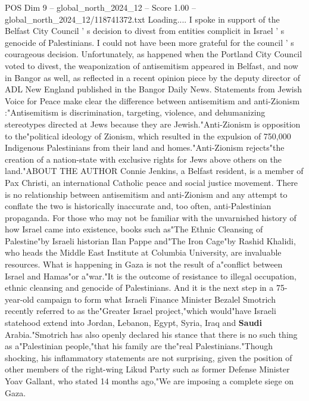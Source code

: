 \begin{textsample}{POS Dim 9 – global\_north\_2024\_12 – Score 1.00 – global\_north\_2024\_12/118741372.txt}  \label{ex:f9_pos_332}
Loading....
I spoke in support of the Belfast City Council ' s decision to divest from entities complicit in Israel ' s genocide of Palestinians.
I could not have been more grateful for the council ' s courageous decision.
Unfortunately, as happened when the Portland City Council voted to divest, the weaponization of antisemitism appeared in Belfast, and now in Bangor as well, as reflected in a recent opinion piece by the deputy director of ADL New England published in the Bangor Daily News.
Statements from Jewish Voice for Peace make clear the difference between antisemitism and anti-Zionism :"Antisemitism is discrimination, targeting, violence, and dehumanizing stereotypes directed at Jews because they are Jewish."Anti-Zionism is opposition to the"political ideology of Zionism, which resulted in the expulsion of 750,000 Indigenous Palestinians from their land and homes."Anti-Zionism rejects"the creation of a nation-state with exclusive rights for Jews above others on the land."ABOUT THE AUTHOR Connie Jenkins, a Belfast resident, is a member of Pax Christi, an international Catholic peace and social justice movement.
There is no relationship between antisemitism and anti-Zionism and any attempt to conflate the two is historically inaccurate and, too often, anti-Palestinian propaganda.
For those who may not be familiar with the unvarnished history of how Israel came into existence, books such as"The Ethnic Cleansing of Palestine"by Israeli historian Ilan Pappe and"The Iron Cage"by Rashid Khalidi, who heads the Middle East Institute at Columbia University, are invaluable resources.
What is happening in Gaza is not the result of a"conflict between Israel and Hamas"or a"war."It is the outcome of resistance to illegal occupation, ethnic cleansing and genocide of Palestinians.
And it is the next step in a 75-year-old campaign to form what Israeli Finance Minister Bezalel Smotrich recently referred to as the"Greater Israel project,"which would"have Israeli statehood extend into Jordan, Lebanon, Egypt, Syria, Iraq and \textbf{Saudi} Arabia."Smotrich has also openly declared his stance that there is no such thing as a"Palestinian people,"that his family are the"real Palestinians."Though shocking, his inflammatory statements are not surprising, given the position of other members of the right-wing Likud Party such as former Defense Minister Yoav Gallant, who stated 14 months ago,"We are imposing a complete siege on Gaza.

\end{textsample}
